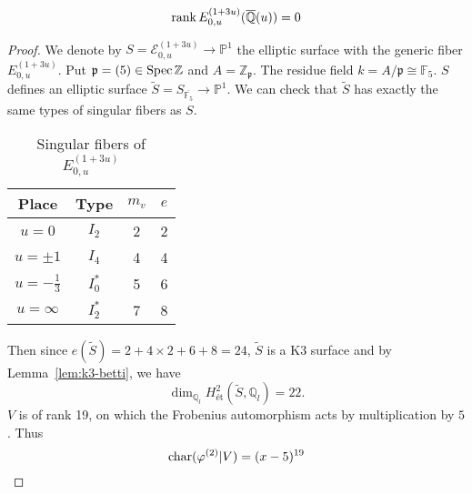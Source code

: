 \documentclass[main]{subfiles}
\begin{document}
\begin{thm}
    \begin{equation*}
        \operatorname{rank} E_{0,u}^{(1 + 3u)}(\overline{\mathbb{Q}}(u)) = 0
    \end{equation*}
\end{thm}
\begin{proof}
    We denote by $S=\mathcal{E}_{0,u}^{(1 + 3u)} \to \mathbb{P}^1$ the elliptic surface with the generic fiber $E_{0,u}^{(1 + 3u)}$.
    Put $\mathfrak{p}=(5) \in \operatorname{Spec} \mathbb{Z}$ and $A = \mathbb{Z}_{\mathfrak{p}}$.
    The residue field $k=A/\mathfrak{p} \cong \mathbb{F}_{5}$.
    $S$ defines an elliptic surface $\tilde{S} = S_{\overline{\mathbb{F}_{5}}} \to \mathbb{P}^1$.
    We can check that $\tilde{S}$ has exactly the same types of singular fibers as $S$.

    \begin{table}[ht]
        \centering
        \caption{Singular fibers of $E_{0,u}^{(1 + 3u)}$}
        \begin{tabular}{|c|c|c|c|}
            \hline
            Place            & Type    & $m_v$ & $e$ \\
            \hline
            $u=0$            & $I_2$   & 2     & 2   \\
            $u=\pm 1$        & $I_4$   & 4     & 4   \\
            $u=-\frac{1}{3}$ & $I_0^*$ & 5     & 6   \\
            $u=\infty$       & $I_2^*$ & 7     & 8   \\
            \hline
        \end{tabular}
        \label{tab:E_{0,u}^{(1 + 3u)}}
    \end{table}
    Then since $e(\tilde{S})=2+4 \times2+6+8=24$, $\tilde{S}$ is a K3 surface and by Lemma~\ref{lem:k3-betti}, we have
    \begin{equation*}
        \dim_{\mathbb{Q}_{l}} H_{\text{\'et}}^{2}(\tilde{S}, \mathbb{Q}_{l}) = 22.
    \end{equation*}
    $V$ is of rank 19, on which the Frobenius automorphism acts by multiplication by $5$.
    Thus
    \begin{equation*}
        \operatorname{char} (\varphi^{(2)} | V) = (x - 5)^{19}
    \end{equation*}


\end{proof}
\end{document}
